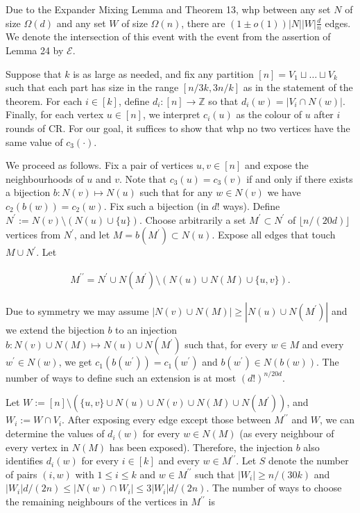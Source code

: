 Due to the Expander Mixing Lemma and Theorem 13, whp between any set $N$ of size $\Omega(d)$ and any set $W$ of size $\Omega(n)$, there are $(1\pm o(1))|N||W|\frac{d}{n}$ edges. We denote the intersection of this event with the event from the assertion of Lemma 24 by $\mathcal{E}$.\par




Suppose that $k$ is as large as needed, and fix any partition $[n]=V_{1}\sqcup\ldots\sqcup V_{k}$ such that each part has size in the range $[n/3k,3n/k]$ as in the statement of the theorem. For each $i\in[k]$, define $d_{i}:[n]\to\mathbb{Z}$ so that $d_{i}(w)=|V_{i}\cap N(w)|$. Finally, for each vertex $u\in[n]$, we interpret $c_{i}(u)$ as the colour of $u$ after $i$ rounds of CR. For our goal, it suffices to show that whp
no two vertices have the same value of $c_{3}(\cdot)$.\par




We proceed as follows. Fix a pair of vertices $u,v\in[n]$ and expose the neighbourhoods of $u$ and $v$.
Note that $c_{3}(u)=c_{3}(v)$ if and only if there exists a bijection $b:N(v)\mapsto N(u)$ such that for any $w\in N(v)$ we have $c_{2}(b(w))=c_{2}(w)$. Fix such a bijection (in $d!$ ways). Define $N^{\prime}:=N(v)\setminus(N(u)\cup\{u\})$.
Choose arbitrarily a set $M^{\prime}\subset N^{\prime}$ of $\lfloor n/(20d)\rfloor$ vertices from $N^{\prime}$, and let $M=b(M^{\prime})\subset N(u)$. Expose all edges that touch $M\cup N^{\prime}$. Let\par


\[\begin{gathered}
M^{\prime\prime}=N^{\prime}\cup N(M^{\prime})\setminus(N(u)\cup N(M)\cup\{u,v\}).
\end{gathered}\]


Due to symmetry we may assume $|N(v)\cup N(M)|\geq|N(u)\cup N(M^{\prime})|$ and we extend the bijection $b$ to an injection $b:N(v)\cup N(M)\mapsto N(u)\cup N(M^{\prime})$ such that, for every $w\in M$ and every $w^{\prime}\in N(w)$, we get $c_{1}(b(w^{\prime}))=c_{1}(w^{\prime})$ and $b(w^{\prime})\in N(b(w))$. The number of ways to define such an extension is at most $(d!)^{n/20d}$.\par




Let $W:=[n]\setminus(\{u,v\}\cup N(u)\cup N(v)\cup N(M)\cup N(M^{\prime}))$, and $W_{i}:=W\cap V_{i}$. After exposing every edge except those between $M^{\prime\prime}$ and $W$, we can determine the values of $d_{i}(w)$ for every $w\in N(M)$ (as every neighbour of every vertex in $N(M)$ has been exposed). Therefore, the injection $b$ also identifies $d_{i}(w)$ for every $i\in[k]$ and every $w\in M^{\prime\prime}$. Let $S$ denote the number of pairs $(i,w)$ with $1\leq i\leq k$ and $w\in M^{\prime\prime}$ such that $|W_{i}|\geq n/(30k)$ and $|W_{i}|d/(2n)\leq|N(w)\cap W_{i}|\leq 3|W_{i}|d/(2n)$. The number of ways to choose the remaining neighbours of the vertices in $M^{\prime\prime}$ is\par


